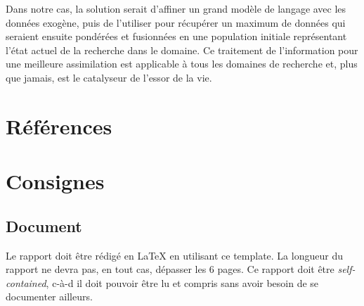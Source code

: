\documentclass[journal, a4paper]{IEEEtran}
\begin{document}
	Dans notre cas, la solution serait d'affiner un grand modèle de
	langage avec les données exogène, puis de
	l'utiliser pour récupérer un maximum de données qui seraient
	ensuite pondérées et
	fusionnées en une population initiale représentant l'état actuel de
	la recherche dans le domaine.
	Ce traitement de l'information pour une meilleure assimilation
	est applicable à tous les domaines de recherche et, plus que jamais,
	est le catalyseur de l'essor de la vie.

\section*{Références}





%

\newpage
		
\appendices
\section{Consignes}\label{sec:consignes}
\subsection*{Document}
	Le rapport doit être rédigé en \LaTeX{} en utilisant ce template.
	La longueur du rapport ne devra pas, en tout cas, dépasser les 6 pages.
	Ce rapport doit être \emph{self-contained}, c-à-d il doit pouvoir être lu et compris sans avoir besoin de se documenter ailleurs.



\end{document}
